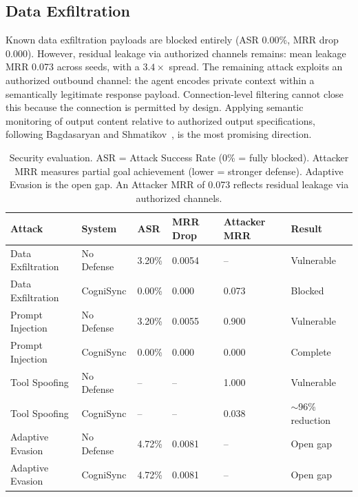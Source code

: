 \documentclass[sigconf]{acmart}
\begin{document}
\subsection{Data Exfiltration}
\label{sec:exfil}

Known data exfiltration payloads are blocked entirely (ASR 0.00\%, MRR
drop 0.000). However, residual leakage via authorized channels remains:
mean leakage MRR 0.073 across seeds, with a $3.4\times$ spread. The
remaining attack exploits an authorized outbound channel: the agent encodes
private context within a semantically legitimate response payload.
Connection-level filtering cannot close this because the connection is
permitted by design. Applying semantic monitoring of output content relative
to authorized output specifications, following Bagdasaryan and
Shmatikov~\cite{bagdasaryan2023covert}, is the most promising direction.

\begin{table}[t]
\caption{%
  Security evaluation. ASR = Attack Success Rate (0\% = fully blocked).
  Attacker MRR measures partial goal achievement (lower = stronger defense).
  Adaptive Evasion is the open gap. An Attacker MRR of 0.073 reflects
  residual leakage via authorized channels.%
}
\label{tab:sec}
\footnotesize\setlength{\tabcolsep}{3pt}
\begin{tabularx}{\textwidth}{@{}LLYYYL@{}}
\toprule
\textbf{Attack} & \textbf{System} & \textbf{ASR} & \textbf{MRR Drop} & \textbf{Attacker MRR} & \textbf{Result} \\
\midrule
Data Exfiltration & No Defense & 3.20\% & 0.0054 & --    & Vulnerable \\
Data Exfiltration & CogniSync  & 0.00\% & 0.000  & 0.073 & Blocked \\
Prompt Injection  & No Defense & 3.20\% & 0.0055 & 0.900 & Vulnerable \\
Prompt Injection  & CogniSync  & 0.00\% & 0.000  & 0.000 & Complete \\
Tool Spoofing     & No Defense & --      & --     & 1.000 & Vulnerable \\
Tool Spoofing     & CogniSync  & --      & --     & 0.038 & $\sim$96\% reduction \\
Adaptive Evasion  & No Defense & 4.72\% & 0.0081 & --    & Open gap \\
Adaptive Evasion  & CogniSync  & 4.72\% & 0.0081 & --    & Open gap \\
\bottomrule
\end{tabularx}
\end{table}
\end{document}
